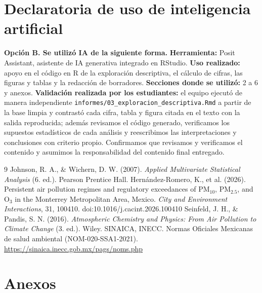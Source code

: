 \documentclass[11pt,letterpaper]{article}
\begin{document}
\section{Declaratoria de uso de inteligencia artificial}
\textbf{Opci\'on B. Se utiliz\'o IA de la siguiente forma.} \textbf{Herramienta:} Posit Assistant, asistente de IA generativa integrado en RStudio. \textbf{Uso realizado:} apoyo en el c\'odigo en R de la exploraci\'on descriptiva, el c\'alculo de cifras, las figuras y tablas y la redacci\'on de borradores. \textbf{Secciones donde se utiliz\'o:} 2 a 6 y anexos. \textbf{Validaci\'on realizada por los estudiantes:} el equipo ejecut\'o de manera independiente \nolinkurl{informes/03_exploracion_descriptiva.Rmd} a partir de la base limpia y contrast\'o cada cifra, tabla y figura citada en el texto con la salida reproducida; adem\'as revisamos el c\'odigo generado, verificamos los supuestos estad\'isticos de cada an\'alisis y reescribimos las interpretaciones y conclusiones con criterio propio. Confirmamos que revisamos y verificamos el contenido y asumimos la responsabilidad del contenido final entregado.

\begin{thebibliography}{9}
\small
\setlength{\itemsep}{0pt}
 Johnson, R. A., \& Wichern, D. W. (2007). \textit{Applied Multivariate Statistical Analysis} (6.\textordfeminine{} ed.). Pearson Prentice Hall.
 Hern\'andez-Romero, K., et al. (2026). Persistent air pollution regimes and regulatory exceedances of PM$_{10}$, PM$_{2.5}$, and O$_3$ in the Monterrey Metropolitan Area, Mexico. \textit{City and Environment Interactions}, 31, 100410. doi:10.1016/j.cacint.2026.100410
 Seinfeld, J. H., \& Pandis, S. N. (2016). \textit{Atmospheric Chemistry and Physics: From Air Pollution to Climate Change} (3.\textordfeminine{} ed.). Wiley.
 SINAICA, INECC. Normas Oficiales Mexicanas de salud ambiental (NOM-020-SSA1-2021). \url{https://sinaica.inecc.gob.mx/pags/noms.php}
\end{thebibliography}

\clearpage
\appendix
\section*{Anexos}
\renewcommand{\thetable}{A\arabic{table}}
\renewcommand{\thefigure}{A\arabic{figure}}
\setcounter{table}{0}
\setcounter{figure}{0}
\end{document}
